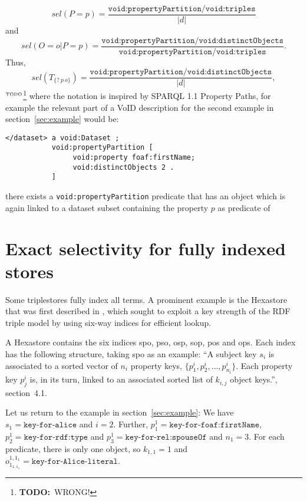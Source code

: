 \documentclass[12pt, draft]{article}
\newcommand{\rdfterm}[1]{\texttt{#1}}
\newcommand{\todo}[1]{\ensuremath{^{\textrm{\tiny{TODO}\normalsize}}}\footnote{\textbf{TODO:}~#1}}
\begin{document}
\begin{equation}\label{eq:selsubjunp}
sel(P = p) = \frac{\rdfterm{void:propertyPartition/void:triples}}{|d|}
\end{equation}
and
\begin{equation}\label{eq:selsubjunop}
sel(O = o|P = p) =
\frac{\rdfterm{void:propertyPartition/void:distinctObjects}}{\rdfterm{void:propertyPartition/void:triples}} .
\end{equation}
Thus,
\begin{equation}\label{eq:selsubjunres}
sel(T_{\{?~p~o\}}) =
\frac{\rdfterm{void:propertyPartition/void:distinctObjects}}{|d|} ,
\end{equation}\todo{WRONG!}
where the notation is inspired by SPARQL 1.1 Property Paths,
for example the relevant part of a VoID description for the second
example in section~\ref{sec:example} would be:
\begin{verbatim}
</dataset> a void:Dataset ;
           void:propertyPartition [
                void:property foaf:firstName;
                void:distinctObjects 2 .
           ]
\end{verbatim}



there exists a \rdfterm{void:propertyPartition} predicate that
has an object which is again linked to a dataset subset containing the
property $p$ as predicate of \text



\section{Exact selectivity for fully indexed stores}

Some triplestores fully index all terms. A prominent example is the
Hexastore that was first described in
\cite{Weiss:2008:HSI:1453856.1453965}, which sought to exploit a key
strength of the RDF triple model by using six-way indices for
efficient lookup.

A Hexastore contains the six indices \textsf{spo}, \textsf{pso},
\textsf{osp}, \textsf{sop}, \textsf{pos} and \textsf{ops}. Each index
has the following structure, taking \textsf{spo} as an example: ``A
subject key $s_i$ is associated to a sorted vector of $n_i$ property
keys, $\{p_1^i , p_2^i , \ldots , p^i_{n_i} \}$. Each property key $p_j^i$
is, in its turn, linked to an associated sorted list of $k_{i,j}$
object keys.''\cite{Weiss:2008:HSI:1453856.1453965}, section~4.1.

Let us return to the example in section~\ref{sec:example}: We have
$s_1 = \texttt{key-for-alice}$ and $i=2$. Further, $p_1^1 =
\texttt{key-for-foaf:firstName}$, $p_2^1 = \texttt{key-for-rdf:type}$ and $p_3^1 =
\texttt{key-for-rel:spouseOf}$ and $n_1 = 3$. For each predicate, there is only
one object, so $k_{1,1} = 1$ and $o_{1_{1,1_1}}^{1,1_1} = \texttt{key-for-Alice-literal}$.
\end{document}
